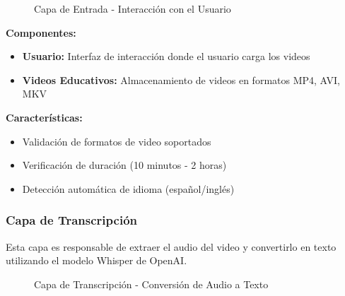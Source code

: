 \documentclass[12pt,a4paper]{article}
\begin{document}
\begin{figure}[H]
    \centering
    \caption{Capa de Entrada - Interacción con el Usuario}
    \label{fig:capa_entrada}
\end{figure}

\textbf{Componentes:}
\begin{itemize}
    \item \textbf{Usuario:} Interfaz de interacción donde el usuario carga los videos
    \item \textbf{Videos Educativos:} Almacenamiento de videos en formatos MP4, AVI, MKV
\end{itemize}

\textbf{Características:}
\begin{itemize}
    \item Validación de formatos de video soportados
    \item Verificación de duración (10 minutos - 2 horas)
    \item Detección automática de idioma (español/inglés)
\end{itemize}

\newpage

\subsubsection{Capa de Transcripción}

Esta capa es responsable de extraer el audio del video y convertirlo en texto utilizando el modelo Whisper de OpenAI.

\begin{figure}[H]
    \centering
    \caption{Capa de Transcripción - Conversión de Audio a Texto}
    \label{fig:capa_transcripcion}
\end{figure}
\end{document}
